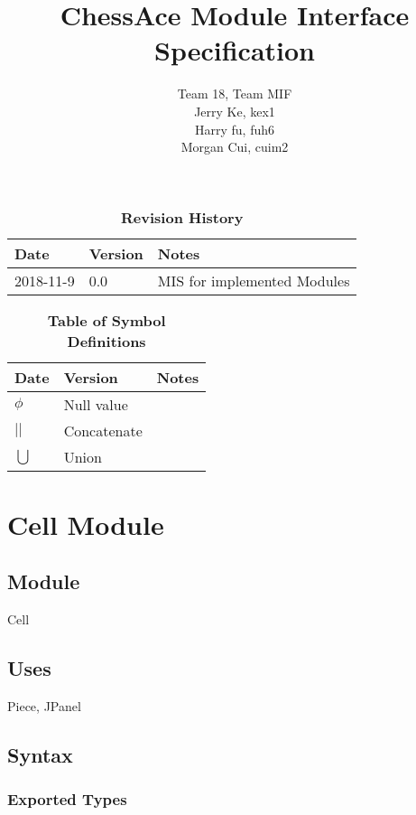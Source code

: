 \documentclass[12pt]{article}
\title{ChessAce Module Interface Specification}
\author{Team 18, Team MIF
		\\ Jerry Ke, kex1
		\\ Harry fu, fuh6
		\\ Morgan Cui, cuim2
}
\begin{document}
\maketitle

\newpage

\begin{table}[H]
\begin{tabularx}{\textwidth}{p{3cm}p{2cm}X}
\toprule {\bf Date} & {\bf Version} & {\bf Notes}\\
\midrule
2018-11-9 & 0.0 & MIS for implemented Modules\\
\bottomrule
\end{tabularx}
\caption{\bf Revision History}
\end{table}

\begin{table}[H]

	\begin{tabularx}{\textwidth}{p{3cm}p{2cm}X}
\toprule {\bf Date} & {\bf Version} & {\bf Notes}\\
\midrule
$\phi$ &Null value\\
\hline
$||$ &Concatenate\\
\hline
$\bigcup$ &Union\\
\bottomrule
\end{tabularx}
		\caption{\bf Table of Symbol Definitions}
		\label{table2}
\end{table}	

\newpage

\section* {Cell Module}

\subsection*{Module}

Cell

\subsection* {Uses}

Piece, JPanel

\subsection* {Syntax}

\subsubsection* {Exported Types}
\end{document}
